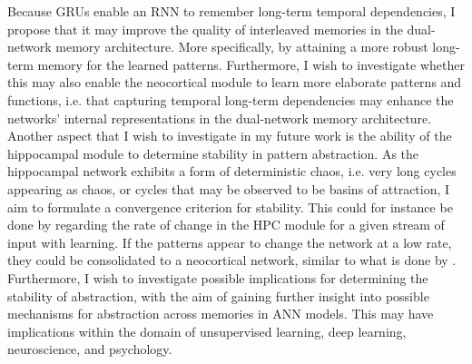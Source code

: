 
Because GRUs enable an RNN to remember long-term temporal dependencies, I propose that it may improve the quality of interleaved memories in the dual-network memory architecture. More specifically, by attaining a more robust long-term memory for the learned patterns. Furthermore, I wish to investigate whether this may also enable the neocortical module to learn more elaborate patterns and functions, i.e. that capturing temporal long-term dependencies may enhance the networks' internal representations in the dual-network memory architecture.
Another aspect that I wish to investigate in my future work is the ability of the hippocampal module to determine stability in pattern abstraction. As the hippocampal network exhibits a form of deterministic chaos, i.e. very long cycles appearing as chaos, or cycles that may be observed to be basins of attraction, I aim to formulate a convergence criterion for stability. This could for instance be done by regarding the rate of change in the HPC module for a given stream of input with learning. If the patterns appear to change the network at a low rate, they could be consolidated to a neocortical network, similar to what is done by \cite{Hattori2014}. Furthermore, I wish to investigate possible implications for determining the stability of abstraction, with the aim of gaining further insight into possible mechanisms for abstraction across memories in ANN models. This may have implications within the domain of unsupervised learning, deep learning, neuroscience, and psychology.


